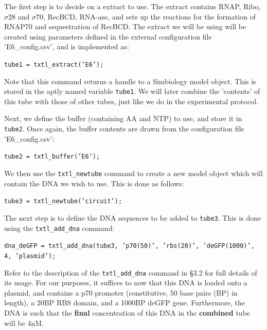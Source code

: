 \documentclass[english]{report}
\begin{document}
		The first step is to decide on a extract to use. The extract contains RNAP, Ribo, $\sigma 28$ and $\sigma 70$, RecBCD, RNA-ase, and sets up the reactions for the formation of RNAP70 and sequestration of RecBCD. The extract we will be using will be created using parameters defined in the external configuration file \textsf{'E6\_config.csv'}, and is implemented as: 
		
				\begin{flushleft}
						\texttt{tube1 = txtl\_extract('E6');} 
				\end{flushleft}	
				
				Note that this command returns a handle to a Simbiology model object. This is stored in the aptly named variable \texttt{tube1}. We will later combine the 'contents' of this tube with those of other tubes, just like we do in the experimental protocol. 
				
Next, we define the buffer (containing AA and NTP) to use, and store it in \texttt{tube2}. Once again, the buffer contents are drawn from the configuration file \textsf{'E6\_config.csv'}:

				\begin{flushleft}
						\texttt{tube2 = txtl\_buffer('E6');} \\	
				\end{flushleft}	 
		
We then use the \texttt{txtl\_newtube} command to create a new model object which will contain the DNA we wish to use. This is done as follows:
		
				\begin{flushleft}
						\texttt{tube3 = txtl\_newtube('circuit');} \\	
				\end{flushleft}	 
				
The next step is to define the DNA sequences to be added to \texttt{tube3}. This is done using the \texttt{txtl\_add\_dna} command:

				\begin{flushleft}
						\texttt{dna\_deGFP = txtl\_add\_dna(tube3, 'p70(50)', 'rbs(20)', 'deGFP(1000)', 4, 'plasmid');} \\	
				\end{flushleft}
Refer to the description of the \texttt{txtl\_add\_dna} command in \S 3.2 for full details of its usage. For our purposes, it suffices to now that this DNA is loaded onto a plasmid, and contains a p70 promoter (constitutive, 50 base pairs (BP) in length), a 20BP RBS domain, and a 1000BP deGFP gene. Furthermore, the DNA is such that the \textbf{final} concentration of this DNA in the \textbf{combined} tube will be 4nM. 
\end{document}
